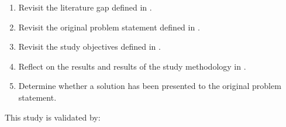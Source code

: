 \begin{enumerate}[label=\textbf{\Roman*.}]
	\item Revisit the literature gap defined in .
	\item Revisit the original problem statement defined in .
	\item Revisit the study objectives defined in .
	\item Reflect on the results and results of the study methodology in .
	\item Determine whether a solution has been presented to the original problem statement. 
\end{enumerate}

This study is validated by:

